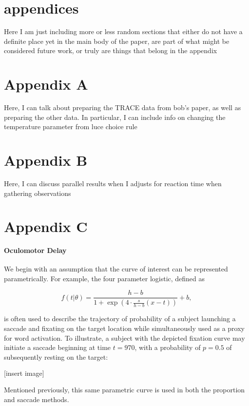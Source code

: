 \documentclass{article}
\begin{document}
\section{appendices}

Here  I am just including more or less random sections that either do not have a definite place yet in the main body of the paper, are part of what might be considered future work, or truly are things that belong in the appendix

\section*{Appendix A}
Here, I can talk about preparing the TRACE data from bob's paper, as well as preparing the other data. In particular, I can include info on changing the temperature parameter from luce choice rule

\section*{Appendix B}

Here, I can discuss parallel results when I adjusts for reaction time when gathering observations

\section*{Appendix C}

\paragraph{Oculomotor Delay}


We begin with an assumption that the curve of interest can be represented parametrically. For example, the four parameter logistic, defined as

$$
f(t|\theta) = \frac{h-b}{1 + \exp\left(4 \cdot \frac{s}{h-b}(x - t) \right)} +b,
$$ 

is often used to describe the trajectory of probability of a subject launching a saccade and fixating on the target location while simultaneously used as a proxy for word activation. To illustrate, a subject with the depicted fixation curve may initiate a saccade beginning at time $t = 970$, with a probability of $p = 0.5$ of subsequently resting on the target:

[insert image]


Mentioned previously, this same parametric curve is used in both the proportion and saccade methods.
\end{document}

